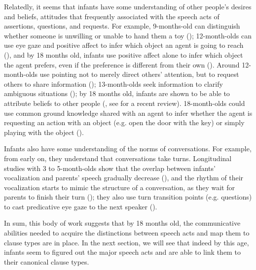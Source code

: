 Relatedly, it seems that infants have some understanding of other people's desires and beliefs, attitudes that frequently associated with the speech acts of assertions, questions, and requests. For example, 9-months-old can distinguish whether someone is unwilling or unable to hand them a toy (\cite{behne2005goal}); 12-month-olds can use eye gaze and positive affect to infer which object an agent is going to reach (\cite{phillips2002gaze}), and by 18 months old, infants use positive affect alone to infer which object the agent prefers, even if the preference is different from their own (\cite{repacholi1997desire}). Around 12-month-olds use pointing not to merely direct others' attention, but to request others to share information (\cite{kovacs2014request}); 13-month-olds seek information to clarify ambiguous situations (\cite{vaish2011request}); by 18 months old, infants are shown to be able to attribute beliefs to other people (\cite{onishi2005tom,surian2007tom,song2008earlytom,song2008false, scott2009tom,perner2012earlytom}, see \cite{scott2017review} for a recent review). 18-month-olds could use common ground knowledge shared with an agent to infer whether the agent is requesting an action with an object (e.g. open the door with the key) or simply playing with the object (\cite{schulze2015indirect}).%
 


Infants also have some understanding of the norms of conversations. For example, from early on, they understand that conversations take turns. Longitudinal studies with 3 to 5-month-olds show that the overlap between infants' vocalization and parents' speech gradually decrease (\cite{hilbrink2013turn3mo}), and the rhythm of their vocalization starts to mimic the structure of a conversation, as they wait for parents to finish their turn (\cite{hilbrink2013turn,hilbrink2015,casillas2016corpus}); they also use turn transition points (e.g. questions) to cast predicative eye gaze to the next speaker (\cite{casillas2017turn}).

 
In sum, this body of work suggests that by 18 months old, the communicative abilities needed to acquire the distinctions between speech acts and map them to clause types are in place. In the next section, we will see that indeed by this age, infants seem to figured out the major speech acts and are able to link them to their canonical clause types.



